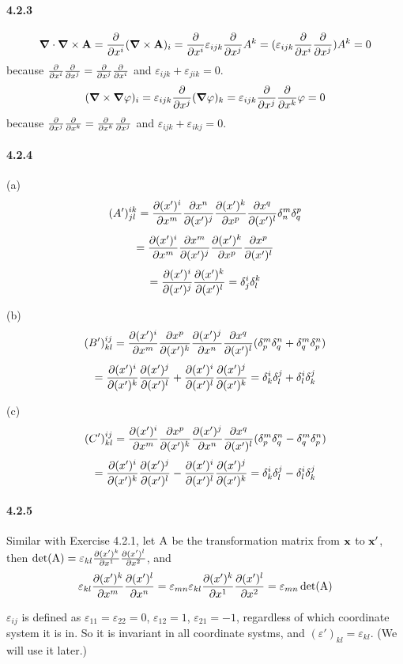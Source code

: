 \documentclass[a4paper]{article}
\begin{document}
\paragraph{4.2.3}
\[
\boldsymbol{\nabla}\cdot\boldsymbol{\nabla}\times\mathbf{A}=\frac{\partial}{\partial x^i}(\boldsymbol{\nabla}\times\mathbf{A})_i=\frac{\partial}{\partial x^i}\varepsilon_{ijk}\frac{\partial}{\partial x^j}A^k
=(\varepsilon_{ijk}\frac{\partial}{\partial x^i}\frac{\partial}{\partial x^j})A^k=0
\]
because $\frac{\partial}{\partial x^i}\frac{\partial}{\partial x^j}=\frac{\partial}{\partial x^j}\frac{\partial}{\partial x^i}$ and $\varepsilon_{ijk}+\varepsilon_{jik}=0$.
\[
(\boldsymbol{\nabla}\times\boldsymbol{\nabla}\varphi)_i=\varepsilon_{ijk}\frac{\partial}{\partial x^j}(\boldsymbol{\nabla}\varphi)_k=\varepsilon_{ijk}\frac{\partial}{\partial x^j}\frac{\partial}{\partial x^k}\varphi=0
\]
because $\frac{\partial}{\partial x^j}\frac{\partial}{\partial x^k}=\frac{\partial}{\partial x^k}\frac{\partial}{\partial x^j}$ and $\varepsilon_{ijk}+\varepsilon_{ikj}=0$.

\paragraph{4.2.4}
(a) 
\[
(A')^{ik}_{jl}=\frac{\partial(x')^i}{\partial x^m}\frac{\partial x^n}{\partial(x')^j}\frac{\partial(x')^k}{\partial x^p}\frac{\partial x^q}{\partial(x')^l}\delta^m_n\delta^p_q
\]
\[
=\frac{\partial(x')^i}{\partial x^m}\frac{\partial x^m}{\partial(x')^j}\frac{\partial(x')^k}{\partial x^p}\frac{\partial x^p}{\partial(x')^l}
\]
\[
=\frac{\partial(x')^i}{\partial(x')^j}\frac{\partial(x')^k}{\partial(x')^l}=\delta^i_j\delta^k_l
\]

(b) 
\[
(B')^{ij}_{kl}=\frac{\partial(x')^i}{\partial x^m}\frac{\partial x^p}{\partial(x')^k}\frac{\partial(x')^j}{\partial x^n}\frac{\partial x^q}{\partial(x')^l}(\delta^m_p\delta^n_q+\delta^m_q\delta^n_p)
\]
\[
=\frac{\partial(x')^i}{\partial(x')^k}\frac{\partial(x')^j}{\partial(x')^l}+\frac{\partial(x')^i}{\partial(x')^l}\frac{\partial(x')^j}{\partial(x')^k}=
\delta^i_k\delta^j_l+\delta^i_l\delta^j_k
\]

(c) 
\[
(C')^{ij}_{kl}=\frac{\partial(x')^i}{\partial x^m}\frac{\partial x^p}{\partial(x')^k}\frac{\partial(x')^j}{\partial x^n}\frac{\partial x^q}{\partial(x')^l}(\delta^m_p\delta^n_q-\delta^m_q\delta^n_p)
\]
\[
=\frac{\partial(x')^i}{\partial(x')^k}\frac{\partial(x')^j}{\partial(x')^l}-\frac{\partial(x')^i}{\partial(x')^l}\frac{\partial(x')^j}{\partial(x')^k}=
\delta^i_k\delta^j_l- \delta^i_l\delta^j_k
\]

\paragraph{4.2.5}
\setcounter{equation}{0}
Similar with Exercise 4.2.1, let $\mathrm{A}$ be the transformation matrix from $\mathbf{x}$ to $\mathbf{x'}$, then $\det(\mathrm{A})=\varepsilon_{kl}\frac{\partial(x')^k}{\partial x^1}\frac{\partial(x')^l}{\partial x^2}$, and
\begin{equation}
    \varepsilon_{kl}\frac{\partial(x')^k}{\partial x^m}\frac{\partial(x')^l}{\partial x^n}=
\varepsilon_{mn}\varepsilon_{kl}\frac{\partial(x')^k}{\partial x^1}\frac{\partial(x')^l}{\partial x^2}=\varepsilon_{mn}\det(\mathrm{A})
\end{equation}

$\varepsilon_{ij}$ is defined as $\varepsilon_{11}=\varepsilon_{22}=0$, $\varepsilon_{12}=1$, $\varepsilon_{21}=-1$, regardless of which coordinate system it is in. So it is invariant in all coordinate systms, and $(\varepsilon')_{kl}=\varepsilon_{kl}$. (We will use it later.)
\end{document}
